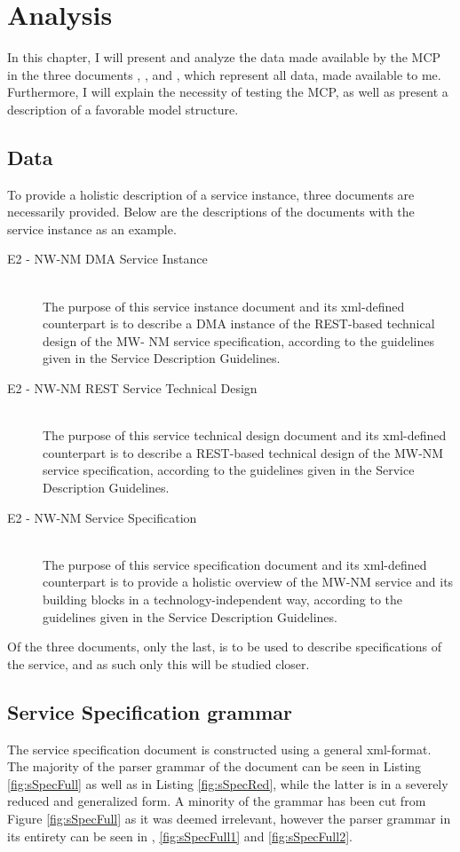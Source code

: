 \chapter{Analysis}

In this chapter, I will present and analyze the data made available by the MCP in the three documents , , and , which represent all data, made available to me. Furthermore, I will explain the necessity of testing the MCP, as well as present a description of a favorable model structure. 

\section{Data}

To provide a holistic description of a service instance, three documents are necessarily provided. Below are the descriptions of the documents with the service instance  as an example.
\begin{description}
	\item[E2 - NW-NM DMA Service Instance]\ \\
		The purpose of this service instance document and its xml-defined counterpart is to describe a DMA instance of the REST-based technical design of the MW- NM service specification, according to the guidelines given in the Service Description Guidelines.
	\item[E2 - NW-NM REST Service Technical Design]\ \\
		The purpose of this service technical design document and its xml-defined counterpart is to describe a REST-based technical design of the MW-NM service specification, according to the guidelines given in the Service Description Guidelines.
	\item[E2 - NW-NM Service Specification]\ \\
		The purpose of this service specification document and its xml-defined counterpart is to provide a holistic overview of the MW-NM service and its building blocks in a technology-independent way, according to the guidelines given in the Service Description Guidelines.
\end{description}
Of the three documents, only the last,  is to be used to describe specifications of the service, and as such only this will be studied closer.
\section{Service Specification grammar}
The service specification document is constructed using a general xml-format. The majority of the parser grammar of the document can be seen in Listing \ref{fig:sSpecFull} as well as in Listing \ref{fig:sSpecRed}, while the latter is in a severely reduced and generalized form. A minority of the grammar has been cut from Figure \ref{fig:sSpecFull} as it was deemed irrelevant, however the parser grammar in its entirety can be seen in , \ref{fig:sSpecFull1} and \ref{fig:sSpecFull2}.

